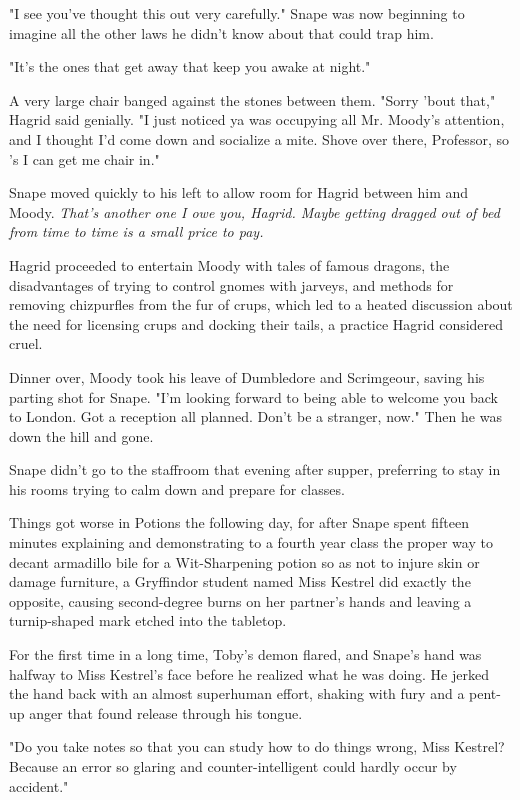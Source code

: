 \documentclass[a4paper,11pt]{article}
\begin{document}
"I see you've thought this out very carefully." Snape was now beginning to imagine all the other laws he didn't know about that could trap him.

"It's the ones that get away that keep you awake at night."

A very large chair banged against the stones between them. "Sorry 'bout that," Hagrid said genially. "I just noticed ya was occupying all Mr. Moody's attention, and I thought I'd come down and socialize a mite. Shove over there, Professor, so 's I can get me chair in."

Snape moved quickly to his left to allow room for Hagrid between him and Moody. \emph{That's another one I owe you, Hagrid. Maybe getting dragged out of bed from time to time is a small price to pay.}

Hagrid proceeded to entertain Moody with tales of famous dragons, the disadvantages of trying to control gnomes with jarveys, and methods for removing chizpurfles from the fur of crups, which led to a heated discussion about the need for licensing crups and docking their tails, a practice Hagrid considered cruel.

Dinner over, Moody took his leave of Dumbledore and Scrimgeour, saving his parting shot for Snape. "I'm looking forward to being able to welcome you back to London. Got a reception all planned. Don't be a stranger, now." Then he was down the hill and gone.

Snape didn't go to the staffroom that evening after supper, preferring to stay in his rooms trying to calm down and prepare for classes.

Things got worse in Potions the following day, for after Snape spent fifteen minutes explaining and demonstrating to a fourth year class the proper way to decant armadillo bile for a Wit-Sharpening potion so as not to injure skin or damage furniture, a Gryffindor student named Miss Kestrel did exactly the opposite, causing second-degree burns on her partner's hands and leaving a turnip-shaped mark etched into the tabletop.

For the first time in a long time, Toby's demon flared, and Snape's hand was halfway to Miss Kestrel's face before he realized what he was doing. He jerked the hand back with an almost superhuman effort, shaking with fury and a pent-up anger that found release through his tongue.

"Do you take notes so that you can study how to do things wrong, Miss Kestrel? Because an error so glaring and counter-intelligent could hardly occur by accident."
\end{document}
